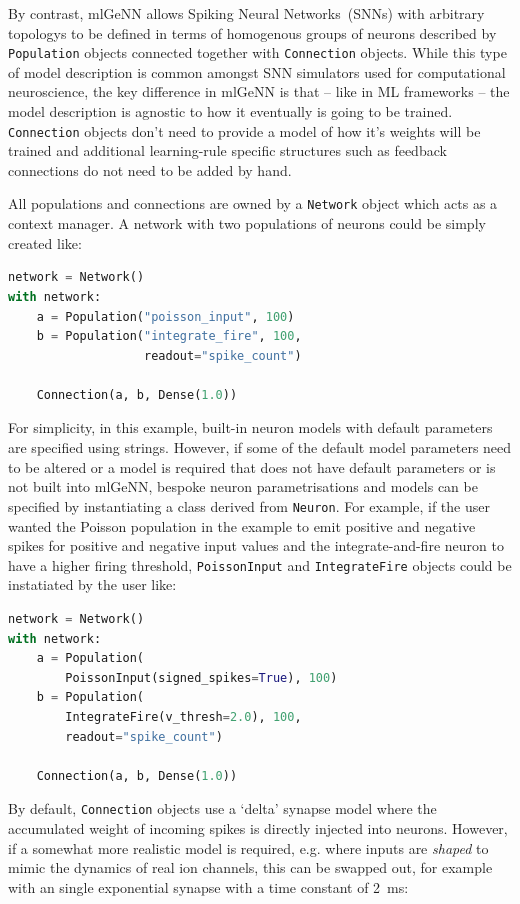\documentclass[sigconf]{acmart}
\begin{document}
By contrast, mlGeNN allows Spiking Neural Networks~(SNNs) with arbitrary topologys to be defined in terms of homogenous groups of neurons described by \lstinline{Population} objects connected together with \lstinline{Connection} objects.
While this type of model description is common amongst SNN simulators used for computational neuroscience, the key difference in mlGeNN is that -- like in ML frameworks -- the model description is agnostic to how it eventually is going to be trained.
\lstinline{Connection} objects don't need to provide a model of how it's weights will be trained and additional learning-rule specific structures such as feedback connections do not need to be added by hand.

All populations and connections are owned by a \lstinline{Network} object which acts as a context manager.
A network with two populations of neurons could be simply created like:

\begin{lstlisting}[language=Python]
network = Network()
with network:
    a = Population("poisson_input", 100)
    b = Population("integrate_fire", 100,
                   readout="spike_count")

    Connection(a, b, Dense(1.0))
\end{lstlisting}
For simplicity, in this example, built-in neuron models with default parameters are specified using strings.
However, if some of the default model parameters need to be altered or a model is required that does not have default parameters or is not built into mlGeNN, bespoke neuron parametrisations and models can be specified by instantiating a class derived from \lstinline{Neuron}.
For example, if the user wanted the Poisson population in the example to emit positive and negative spikes for positive and negative input values and the integrate-and-fire neuron to have a higher firing threshold, \lstinline{PoissonInput} and \lstinline{IntegrateFire} objects could be instatiated by the user like:
\begin{lstlisting}[language=Python]
network = Network()
with network:
    a = Population(
        PoissonInput(signed_spikes=True), 100)
    b = Population(
        IntegrateFire(v_thresh=2.0), 100,
        readout="spike_count")

    Connection(a, b, Dense(1.0))
\end{lstlisting}
By default, \lstinline{Connection} objects use a `delta' synapse model where the accumulated weight of incoming spikes is directly injected into neurons. 
However, if a somewhat more realistic model is required, e.g. where inputs are \emph{shaped} to mimic the dynamics of real ion channels, this can be swapped out, for example with an single exponential synapse with a time constant of \SI{2}{\milli\second}:
\end{document}
